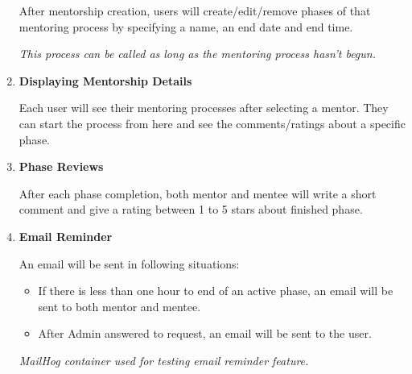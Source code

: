 \documentclass[10pt]{article}
\begin{document}
\begin{enumerate}
After mentorship creation, users will create/edit/remove phases of that mentoring process by
specifying a name, an end date and end time.

\textit{This process can be called as long as the mentoring process hasn't begun.}


\item \textbf{Displaying Mentorship Details}

Each user will see their mentoring processes after selecting a mentor. They can start the
process from here and see the comments/ratings about a specific phase.


\item \textbf{Phase Reviews}

After each phase completion, both mentor and mentee will write a short comment and give a
rating between 1 to 5 stars about finished phase.


\item \textbf{Email Reminder}

An email will be sent in following situations:
\begin{itemize}
    \item If there is less than one hour to end of an active phase, an email will be sent 
    to both mentor and mentee.
    \item After Admin answered to request, an email will be sent to the user.
\end{itemize}

\textit{MailHog container used for testing email reminder feature.}

\end{enumerate}
\end{document}
